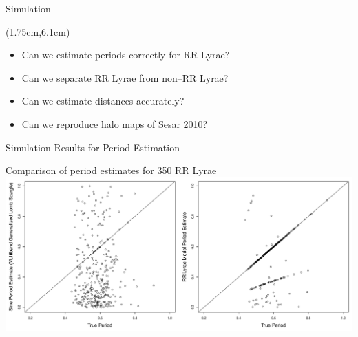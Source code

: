 \documentclass[12pt]{beamer}
\begin{document}
\begin{frame}{Simulation}
  \begin{textblock*}{12cm}(1.75cm,6.1cm) %
\begin{itemize}
\item Can we estimate periods correctly for RR Lyrae?
\item Can we separate RR Lyrae from non--RR Lyrae? 
\item Can we estimate distances accurately?
\item Can we reproduce halo maps of Sesar 2010?
\end{itemize}
\end{textblock*}

\end{frame}


\begin{frame}{Simulation Results for Period Estimation}



\begin{center}
Comparison of period estimates for 350 RR Lyrae\\
\includegraphics[scale=.25]{figs/period_comparison.pdf}
\end{center}



\end{frame}
\end{document}
